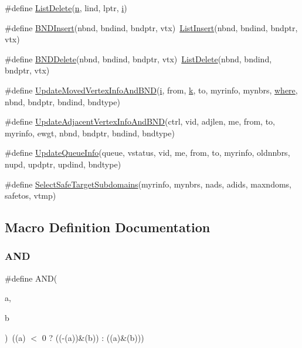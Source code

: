 \begin{DoxyCompactItemize}
$$\#define \hyperlink{a00921_a5424e40b64affec7a59ea251232f7ddb}{List\+Delete}(\hyperlink{a00623_a781a04ab095280f838ff3eb0e51312e0}{n},  lind,  lptr,  \hyperlink{a00608_afb6aca53df96564f2adf086c942453ec}{i})
\item 
\#define \hyperlink{a00921_a3e31d128b80999f03f99b89c706e3756}{B\+N\+D\+Insert}(nbnd,  bndind,  bndptr,  vtx)~\hyperlink{a00921_ae8effdd57854ec8ad785c63c5d71b962}{List\+Insert}(nbnd, bndind, bndptr, vtx)
\item 
\#define \hyperlink{a00921_a50c0ec343fb393d7e2334d15a2d22003}{B\+N\+D\+Delete}(nbnd,  bndind,  bndptr,  vtx)~\hyperlink{a00921_a5424e40b64affec7a59ea251232f7ddb}{List\+Delete}(nbnd, bndind, bndptr, vtx)
\item 
\#define \hyperlink{a00921_a0c30243de59c6592fd5eac3d6e664de8}{Update\+Moved\+Vertex\+Info\+And\+B\+ND}(\hyperlink{a00608_afb6aca53df96564f2adf086c942453ec}{i},  from,  \hyperlink{a00605_a6086917dfee54d84abe1838505c8cf69}{k},  to,  myrinfo,  mynbrs,  \hyperlink{a00879_a7a355801f721e9d8d4ae03590a3a56b0}{where},  nbnd,  bndptr,  bndind,  bndtype)
\item 
\#define \hyperlink{a00921_a26232babdc90a9773ee4ca34777b9e2c}{Update\+Adjacent\+Vertex\+Info\+And\+B\+ND}(ctrl,  vid,  adjlen,  me,  from,  to,  myrinfo,  ewgt,  nbnd,  bndptr,  bndind,  bndtype)
\item 
\#define \hyperlink{a00921_af7766ae41587b123ec2039322f71c2a6}{Update\+Queue\+Info}(queue,  vstatus,  vid,  me,  from,  to,  myrinfo,  oldnnbrs,  nupd,  updptr,  updind,  bndtype)
\item 
\#define \hyperlink{a00921_a83d02a6c5a464ef6c6f3f55e2a29aa0d}{Select\+Safe\+Target\+Subdomains}(myrinfo,  mynbrs,  nads,  adids,  maxndoms,  safetos,  vtmp)
\end{DoxyCompactItemize}


\subsection{Macro Definition Documentation}
\mbox{\label{a00921_a51db6ba85772031b0a49ab3b1e46fc87}} 
\subsubsection{\texorpdfstring{A\+ND}{AND}}
{\footnotesize\ttfamily \#define A\+ND(\begin{DoxyParamCaption}\item[{}]{a,  }\item[{}]{b }\end{DoxyParamCaption})~((a) $<$ 0 ? ((-\/(a))\&(b)) \+: ((a)\&(b)))}

